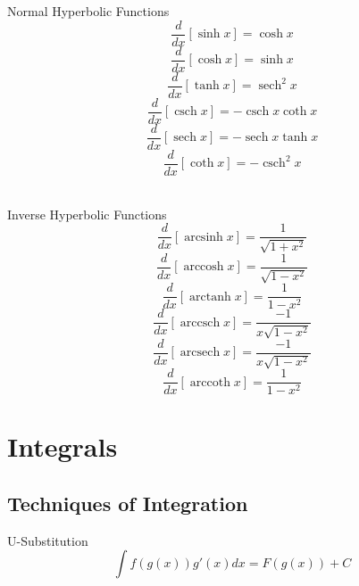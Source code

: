 \documentclass[12pt]{article}
\numberwithin{equation}{subsection}
\DeclareMathOperator{\sech}{sech}
\DeclareMathOperator{\csch}{csch}
\DeclareMathOperator{\arcsinh}{arcsinh}
\DeclareMathOperator{\arccosh}{arccosh}
\DeclareMathOperator{\arctanh}{arctanh}
\DeclareMathOperator{\arccsch}{arccsch}
\DeclareMathOperator{\arcsech}{arcsech}
\DeclareMathOperator{\arccoth}{arccoth}
\begin{document}
\begin{flushleft}
Normal Hyperbolic Functions
\begin{equation}
\frac{d}{dx}[\sinh{x}]=\cosh{x}
\end{equation}
\begin{equation}
\frac{d}{dx}[\cosh{x}]=\sinh{x}
\end{equation}
\begin{equation}
\frac{d}{dx}[\tanh{x}]=\sech^{2}x
\end{equation}
\begin{equation}
\frac{d}{dx}[\csch{x}]=-\csch{x} \coth{x}
\end{equation}
\begin{equation}
\frac{d}{dx}[\sech{x}]=-\sech{x} \tanh{x}
\end{equation}
\begin{equation}
\frac{d}{dx}[\coth{x}]=-\csch^{2}x
\end{equation}\\
\bigskip 

Inverse Hyperbolic Functions
\begin{equation}
\frac{d}{dx}[\arcsinh{x}]=\frac{1}{\sqrt{1+x^{2}}}
\end{equation}
\begin{equation}
\frac{d}{dx}[\arccosh{x}]=\frac{1}{\sqrt{1-x^{2}}}
\end{equation}
\begin{equation}
\frac{d}{dx}[\arctanh{x}]=\frac{1}{1-x^{2}}
\end{equation}
\begin{equation}
\frac{d}{dx}[\arccsch{x}]=\frac{-1}{ x  \sqrt{1-x^{2}}}
\end{equation}
\begin{equation}
\frac{d}{dx}[\arcsech{x}]=\frac{-1}{ x \sqrt{1-x^{2}}}
\end{equation}
\begin{equation}
\frac{d}{dx}[\arccoth{x}]=\frac{1}{1-x^{2}}
\end{equation}
\newpage

\section{Integrals}
\subsection{Techniques of Integration}

U-Substitution
\begin{equation}
\int f(g(x))g'(x) dx = F(g(x))+C
\end{equation}


\end{flushleft}
\end{document}
